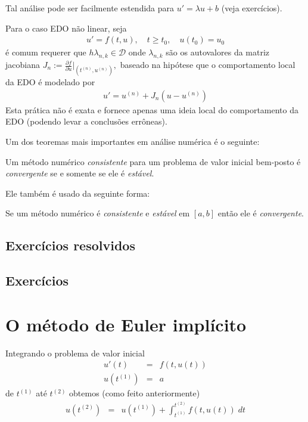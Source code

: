 Tal análise pode ser facilmente estendida para $u'=\lambda u+b$ (veja exercícios).

Para o caso EDO não linear, seja
\begin{eqnarray}
u'= f(t,u), \quad  t\geq t_0, \quad  u(t_0)=u_0
\end{eqnarray}
é comum requerer que $h\lambda _{n,k} \in \mathcal D$ onde $\lambda _{n,k}$ são os autovalores da matriz jacobiana $J_n := \frac{\partial f}{\partial u}|_{(t^{(n)},u^{(n)})},$ baseado na hipótese que o comportamento local da EDO é modelado por
\begin{eqnarray}
  u'= u^{(n)} + J_n(u-u^{(n)})
\end{eqnarray}
Esta prática não é exata e fornece apenas uma ideia local do comportamento da EDO (podendo levar a conclusões errôneas).


Um dos teoremas mais importantes em análise numérica é o seguinte:

\begin{teo}
Um método numérico \emph{consistente} para um problema de valor inicial bem-posto é \emph{convergente} se e somente se ele é \emph{estável}.
\end{teo}


Ele também é usado da seguinte forma:

\begin{teo}
Se um método numérico é \emph{consistente} e \emph{estável} em $[a,b]$ então ele é \emph{convergente}.
\end{teo}



\subsection*{Exercícios resolvidos}

\emconstrucao

\subsection*{Exercícios}

\emconstrucao


\section{O método de Euler implícito}
Integrando o problema de valor inicial
\begin{eqnarray}
  u'(t)  &=& f(t,u(t)) \\
  u(t^{(1)}) &=& a
\end{eqnarray}
de $t^{(1)}$ até $t^{(2)}$ obtemos (como feito anteriormente)
\begin{eqnarray}
  u(t^{(2)})      &=& u(t^{(1)}) +  \int_{t^{(1)}}^{t^{(2)}} f(t,u(t)) \; dt
\end{eqnarray}

